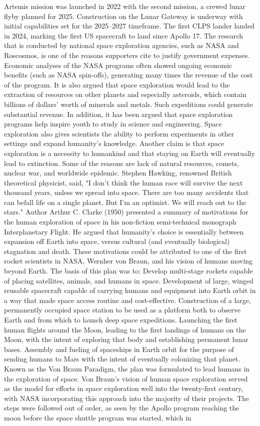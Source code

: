 \documentclass[12pt]{article}
\begin{document}
Artemis mission was launched in 2022 with the second mission, a crewed lunar flyby planned for 2025. Construction on the Lunar Gateway is underway with initial capabilities set for the 2025–2027 timeframe. The first CLPS lander landed in 2024, marking the first US spacecraft to land since Apollo 17. The research that is conducted by national space exploration agencies, such as NASA and Roscosmos, is one of the reasons supporters cite to justify government expenses. Economic analyses of the NASA programs often showed ongoing economic benefits (such as NASA spin-offs), generating many times the revenue of the cost of the program. It is also argued that space exploration would lead to the extraction of resources on other planets and especially asteroids, which contain billions of dollars' worth of minerals and metals. Such expeditions could generate substantial revenue. In addition, it has been argued that space exploration programs help inspire youth to study in science and engineering. Space exploration also gives scientists the ability to perform experiments in other settings and expand humanity's knowledge. Another claim is that space exploration is a necessity to humankind and that staying on Earth will eventually lead to extinction. Some of the reasons are lack of natural resources, comets, nuclear war, and worldwide epidemic. Stephen Hawking, renowned British theoretical physicist, said, "I don't think the human race will survive the next thousand years, unless we spread into space. There are too many accidents that can befall life on a single planet. But I'm an optimist. We will reach out to the stars." Author Arthur C. Clarke (1950) presented a summary of motivations for the human exploration of space in his non-fiction semi-technical monograph Interplanetary Flight. He argued that humanity's choice is essentially between expansion off Earth into space, versus cultural (and eventually biological) stagnation and death. These motivations could be attributed to one of the first rocket scientists in NASA, Wernher von Braun, and his vision of humans moving beyond Earth. The basis of this plan was to: Develop multi-stage rockets capable of placing satellites, animals, and humans in space. Development of large, winged reusable spacecraft capable of carrying humans and equipment into Earth orbit in a way that made space access routine and cost-effective. Construction of a large, permanently occupied space station to be used as a platform both to observe Earth and from which to launch deep space expeditions. Launching the first human flights around the Moon, leading to the first landings of humans on the Moon, with the intent of exploring that body and establishing permanent lunar bases. Assembly and fueling of spaceships in Earth orbit for the purpose of sending humans to Mars with the intent of eventually colonizing that planet. Known as the Von Braun Paradigm, the plan was formulated to lead humans in the exploration of space. Von Braun's vision of human space exploration served as the model for efforts in space exploration well into the twenty-first century, with NASA incorporating this approach into the majority of their projects. The steps were followed out of order, as seen by the Apollo program reaching the moon before the space shuttle program was started, which in 
\end{document}
